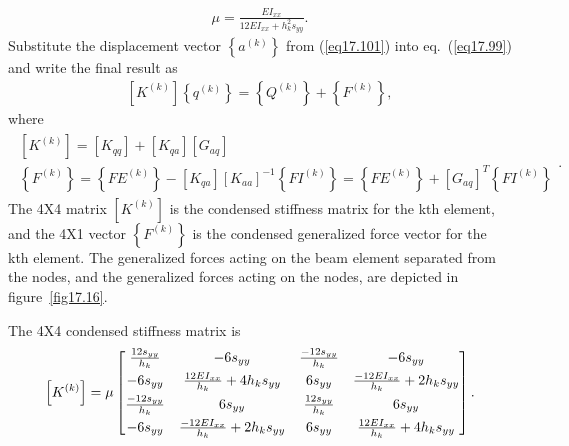 \documentclass{AeroStructure-ERJohnson}
\begin{document}
\begin{align}\label{eq17.103}
\mu=\frac{E I_{x x}}{12 E I_{x x}+h_{k}^{2} s_{y y}}.
\end{align}
Substitute the displacement vector $\left\{a^{(k)}\right\}$ from (\ref{eq17.101}) into eq.~(\ref{eq17.99}) and write the final result as
\begin{align}\label{eq17.104}
\left[K^{(k)}\right]\left\{q^{(k)}\right\}=\left\{Q^{(k)}\right\}+\left\{F^{(k)}\right\},
\end{align}
where
\begin{align}\label{eq17.105}
\begin{gathered} {\left[K^{(k)}\right]=\left[K_{q q}\right]+\left[K_{q a}\right]\left[G_{a q}\right]} \\ \left\{F^{(k)}\right\}=\left\{F E^{(k)}\right\}-\left[K_{q a}\right]\left[K_{a a}\right]^{-1}\left\{F I^{(k)}\right\}=\left\{F E^{(k)}\right\}+\left[G_{a q}\right]^{T}\left\{F I^{(k)}\right\}\end{gathered}.
\end{align}
The 4X4 matrix $\left[K^{(k)}\right]$ is the condensed stiffness matrix for the kth element, and the 4X1 vector $\left\{F^{(k)}\right\}$ is the condensed generalized force vector for the kth element. The generalized forces acting on the beam element separated from the nodes, and the generalized forces acting on the nodes, are depicted in figure~\ref{fig17.16}.

{\def\thefigure{17.16}
}



The 4X4 condensed stiffness matrix is
\begin{align}\label{eq17.106}
\left[K^{(k)}\right]=\mu\left[\begin{array}{@{}cccc@{}}\frac{12 s_{y y}}{h_{k}} & -6 s_{y y} & \frac{-12 s_{y y}}{h_{k}} & -6 s_{y y} \\[4pt]-6 s_{y y} & \frac{12 E I_{x x}}{h_{k}}+4 h_{k} s_{y y} & 6 s_{y y} & \frac{-12 E I_{x x}}{h_{k}}+2 h_{k} s_{y y} \\[4pt]\frac{-12 s_{y y}}{h_{k}} & 6 s_{y y} & \frac{12 s_{y y}}{h_{k}} & 6 s_{y y} \\[4pt]-6 s_{y y} & \frac{-12 E I_{x x}}{h_{k}}+2 h_{k} s_{y y} & 6 s_{y y} & \frac{12 E I_{x x}}{h_{k}}+4 h_{k} s_{y y}\end{array}\right].
\end{align}
\end{document}
